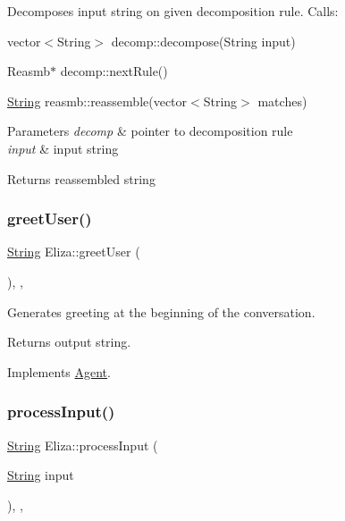Decomposes input string on given decomposition rule. Calls\+:
\begin{DoxyItemize}
\item vector$<$\+String$>$ decomp\+::decompose(\+String input)
\item Reasmb$\ast$ decomp\+::next\+Rule()
\item \mbox{\hyperlink{classString}{String}} reasmb\+::reassemble(vector$<$\+String$>$ matches) 
\begin{DoxyParams}{Parameters}
{\em decomp} & pointer to decomposition rule \\
\hline
{\em input} & input string \\
\hline
\end{DoxyParams}
\begin{DoxyReturn}{Returns}
reassembled string 
\end{DoxyReturn}

\end{DoxyItemize}\mbox{\label{classEliza_a87224cd89d0e0dafbc2e8883d1a83f14}} 
\subsubsection{\texorpdfstring{greet\+User()}{greetUser()}}
{\footnotesize\ttfamily \mbox{\hyperlink{classString}{String}} Eliza\+::greet\+User (\begin{DoxyParamCaption}{ }\end{DoxyParamCaption})\hspace{0.3cm}{\ttfamily [override]}, {\ttfamily [private]}, {\ttfamily [virtual]}}

Generates greeting at the beginning of the conversation. \begin{DoxyReturn}{Returns}
output string. 
\end{DoxyReturn}


Implements \mbox{\hyperlink{classAgent_a753289e615d0fbe962453695e41bd0b6}{Agent}}.

\mbox{\label{classEliza_a9700906fb44016db11cd1183d5a1f1f3}} 
\subsubsection{\texorpdfstring{process\+Input()}{processInput()}}
{\footnotesize\ttfamily \mbox{\hyperlink{classString}{String}} Eliza\+::process\+Input (\begin{DoxyParamCaption}\item[{\mbox{\hyperlink{classString}{String}}}]{input }\end{DoxyParamCaption})\hspace{0.3cm}{\ttfamily [override]}, {\ttfamily [private]}, {\ttfamily [virtual]}}

